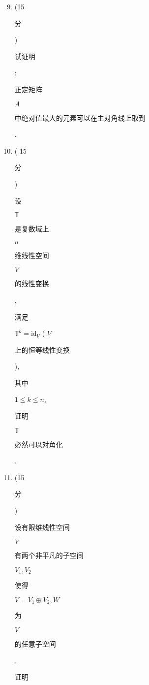 \documentclass[10pt]{article}
\begin{document}
\begin{enumerate}
  \setcounter{enumi}{8}
  \item (15\begin{CJK}{UTF8}{mj}分\end{CJK}) \begin{CJK}{UTF8}{mj}试证明\end{CJK}: \begin{CJK}{UTF8}{mj}正定矩阵\end{CJK} $A$ \begin{CJK}{UTF8}{mj}中绝对值最大的元素可以在主对角线上取到\end{CJK}.

  \item ( 15 \begin{CJK}{UTF8}{mj}分\end{CJK}) \begin{CJK}{UTF8}{mj}设\end{CJK} $\mathbb{T}$ \begin{CJK}{UTF8}{mj}是复数域上\end{CJK} $n$ \begin{CJK}{UTF8}{mj}维线性空间\end{CJK} $V$ \begin{CJK}{UTF8}{mj}的线性变换\end{CJK}, \begin{CJK}{UTF8}{mj}满足\end{CJK} $\mathbb{T}^{k}=\mathrm{id}_{V}$ ( $V$ \begin{CJK}{UTF8}{mj}上的恒等线性变换\end{CJK}), \begin{CJK}{UTF8}{mj}其中\end{CJK} $1 \leqslant k \leqslant n$, \begin{CJK}{UTF8}{mj}证明\end{CJK} $\mathbb{T}$ \begin{CJK}{UTF8}{mj}必然可以对角化\end{CJK}.

  \item (15\begin{CJK}{UTF8}{mj}分\end{CJK}) \begin{CJK}{UTF8}{mj}设有限维线性空间\end{CJK} $V$ \begin{CJK}{UTF8}{mj}有两个非平凡的子空间\end{CJK} $V_{1}, V_{2}$ \begin{CJK}{UTF8}{mj}使得\end{CJK} $V=V_{1} \oplus V_{2}, W$ \begin{CJK}{UTF8}{mj}为\end{CJK} $V$ \begin{CJK}{UTF8}{mj}的任意子空间\end{CJK}. \begin{CJK}{UTF8}{mj}证明\end{CJK}

\end{enumerate}
\end{document}
